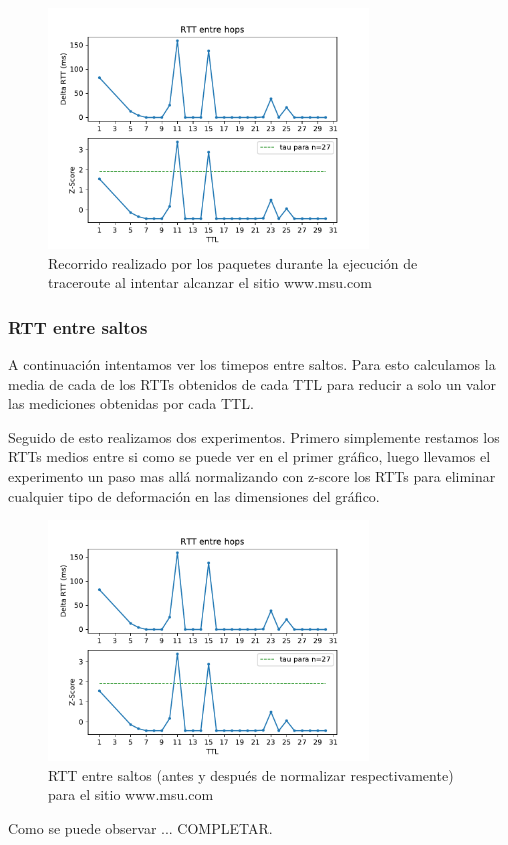 \begin{figure}[H]
  \centering
  \includegraphics[width=8.5cm]{figs/traceroute-moscow.pdf}
  \caption{\normalfont Recorrido realizado por los paquetes durante la ejecución de traceroute al intentar alcanzar el sitio www.msu.com}
\end{figure}

\subsubsection*{RTT entre saltos}

A continuación intentamos ver los timepos entre saltos. Para esto calculamos la media de cada de los RTTs obtenidos de cada TTL para reducir a solo un valor las mediciones obtenidas por cada TTL. 

Seguido de esto realizamos dos experimentos. Primero simplemente restamos los RTTs medios entre si como se puede ver en el primer gráfico, luego llevamos el experimento un paso mas allá normalizando con z-score los RTTs para eliminar cualquier tipo de deformación en las dimensiones del gráfico.

\begin{figure}[H]
  \centering
  \includegraphics[width=8.5cm]{figs/traceroute-moscow.pdf}
  \caption{\normalfont RTT entre saltos (antes y después de normalizar respectivamente) para el sitio www.msu.com}
\end{figure}

Como se puede observar ... COMPLETAR.